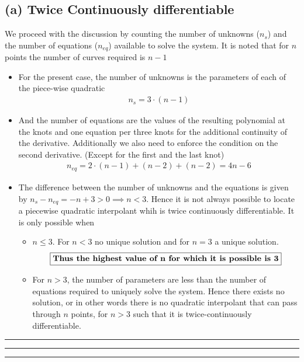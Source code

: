 \subsection*{(a) Twice Continuously differentiable}
We proceed with the discussion by counting the number of unknowns ($n_s$) and the number of equations ($n_{eq}$) available to solve the system. It is noted that for $n$ points the number of curves required is $n-1$
\begin{itemize}
\item For the present case, the number of unknowns is the parameters of each of the piece-wise quadratic
\begin{align*}
n_s = 3\cdot(n-1)
\end{align*}
\item And the number of equations are the values of the resulting polynomial at the knots and one equation per three knots for the additional continuity of the derivative. Additionally we also need to enforce the condition on the second derivative. (Except for the first and the last knot)
\begin{align*}
n_{eq} = 2\cdot(n-1) + (n-2) + (n-2) = 4n-6
\end{align*}
\item The difference between the number of unknowns and the equations is given by $n_s - n_{eq} = -n+3 > 0\implies n<3$. Hence it is not always possible to locate a piecewise quadratic interpolant whih is twice continuously differentiable. It is only possible when
\begin{itemize}
\item $n\leq 3$. For $n<3$ no unique solution and for $n=3$ a unique solution. 
\begin{align}
\boxed{\text{\bf Thus the highest value of n for which it is possible is 3}}
\end{align}
\item For $n>3$, the number of parameters are less than the number of equations required to uniquely solve the system. Hence there exists no solution, or in other words there is no quadratic interpolant that can pass through $n$ points, for $n>3$ such that it is twice-continuously differentiable. 
\end{itemize}
\end{itemize}\hrule\hrule\hrule

